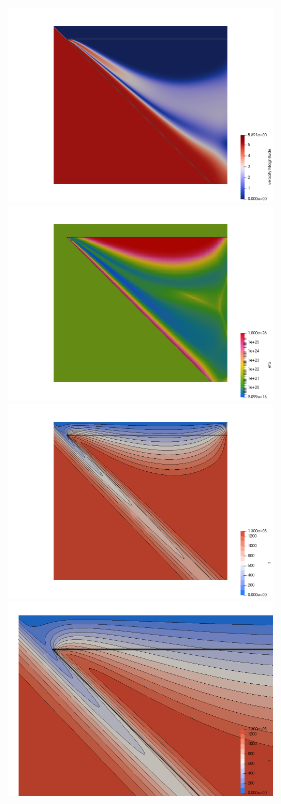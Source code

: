 \begin{center}
\includegraphics[width=7cm]{python_codes/fieldstone_68/results/case2b/vel}
\includegraphics[width=7cm]{python_codes/fieldstone_68/results/case2b/eta}\\
\includegraphics[width=7cm]{python_codes/fieldstone_68/results/case2b/T}
\includegraphics[width=7cm]{python_codes/fieldstone_68/results/case2b/T_zoom}
\end{center}

